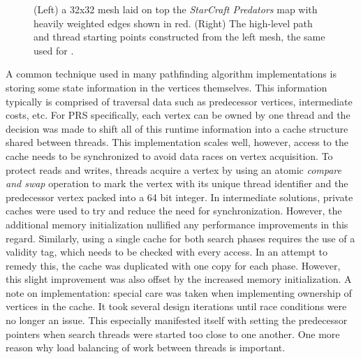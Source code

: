 \begin{figure}[H]
	\centering
	
	\captionsetup[subfigure]{labelformat=empty}
	\hfill
	\caption{(Left) a 32x32 mesh laid on top the \textit{StarCraft Predators} map with heavily weighted edges shown in red. (Right) The high-level path and thread starting points constructed from the left mesh, the same used for .} 
	\label{fig:high}
\end{figure}

A common technique used in many pathfinding algorithm implementations is storing some state information in the vertices themselves. 
This information typically is comprised of traversal data such as predecessor vertices, intermediate costs, etc.
For PRS specifically, each vertex can be owned by one thread and the decision was made to shift all of this runtime information into a cache structure shared between threads.
This implementation scales well, however, access to the cache needs to be synchronized to avoid data races on vertex acquisition.
To protect reads and writes, threads acquire a vertex by using an atomic \textit{compare and swap} operation to mark the vertex with its unique thread identifier and the predecessor vertex packed into a 64 bit integer. In intermediate solutions, private caches were used to try and reduce the need for synchronization. However, the additional memory initialization nullified any performance improvements in this regard. Similarly, using a single cache for both search phases requires the use of a validity tag, which needs to be checked with every access. In an attempt to remedy this, the cache was duplicated with one copy for each phase. However, this slight improvement was also offset by the increased memory initialization.
A note on implementation: special care was taken when implementing ownership of vertices in the cache. 
It took several design iterations until race conditions were no longer an issue. This especially manifested itself with setting the predecessor pointers when search threads were started too close to one another.
One more reason why load balancing of work between threads is important.

